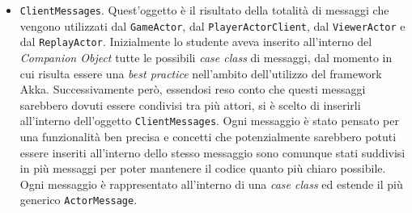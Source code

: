      \begin{itemize}
     \item \texttt{ClientMessages}.
     Quest'oggetto è il risultato della totalità di messaggi che vengono utilizzati dal \texttt{GameActor}, dal \texttt{PlayerActorClient}, dal \texttt{ViewerActor} e dal \texttt{ReplayActor}. Inizialmente lo studente aveva inserito all'interno del \textit{Companion Object} tutte le possibili \textit{case class} di messaggi, dal momento in cui risulta essere una \textit{best practice} nell'ambito dell'utilizzo del framework Akka. Successivamente però, essendosi reso conto che questi messaggi sarebbero dovuti essere condivisi tra più attori, si è scelto di inserirli all'interno dell'oggetto \texttt{ClientMessages}. Ogni messaggio è stato pensato per una funzionalità ben precisa e concetti che potenzialmente sarebbero potuti essere inseriti all'interno dello stesso messaggio sono comunque stati suddivisi in più messaggi per poter mantenere il codice quanto più chiaro possibile. Ogni messaggio è rappresentato all'interno di una \textit{case class} ed estende il più generico \texttt{ActorMessage}. 
     

\end{itemize}
